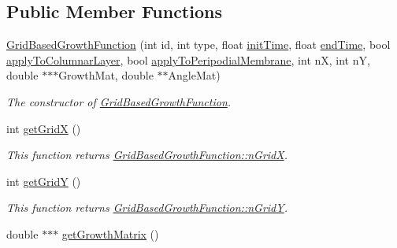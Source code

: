\subsection*{Public Member Functions}
\begin{DoxyCompactItemize}
\item 
\hyperlink{classGridBasedGrowthFunction_aac341fa9ccdca2d089e9f341cb68ca94}{Grid\+Based\+Growth\+Function} (int id, int type, float \hyperlink{classGrowthFunctionBase_ae92513a7b41637df8e26e7db35ddf97c}{init\+Time}, float \hyperlink{classGrowthFunctionBase_a3ff4db0573d354a75666a5f3ca446941}{end\+Time}, bool \hyperlink{classGrowthFunctionBase_a3d56771e7c145589a14e11cc331e0326}{apply\+To\+Columnar\+Layer}, bool \hyperlink{classGrowthFunctionBase_a08ae19f58cb98fa8e315a77f52749732}{apply\+To\+Peripodial\+Membrane}, int n\+X, int n\+Y, double $\ast$$\ast$$\ast$Growth\+Mat, double $\ast$$\ast$Angle\+Mat)
\begin{DoxyCompactList}\small\item\em The constructor of \hyperlink{classGridBasedGrowthFunction}{Grid\+Based\+Growth\+Function}. \end{DoxyCompactList}\item 
\hypertarget{classGridBasedGrowthFunction_ae36e6ea2e7bdf41459e74d5846d6d24d}{}int \hyperlink{classGridBasedGrowthFunction_ae36e6ea2e7bdf41459e74d5846d6d24d}{get\+Grid\+X} ()\label{classGridBasedGrowthFunction_ae36e6ea2e7bdf41459e74d5846d6d24d}

\begin{DoxyCompactList}\small\item\em This function returns \hyperlink{classGridBasedGrowthFunction_af872b9963f3a579dcd615c23bcb58a86}{Grid\+Based\+Growth\+Function\+::n\+Grid\+X}. \end{DoxyCompactList}\item 
\hypertarget{classGridBasedGrowthFunction_a4a70e9e187e3079e29115f106d30e26e}{}int \hyperlink{classGridBasedGrowthFunction_a4a70e9e187e3079e29115f106d30e26e}{get\+Grid\+Y} ()\label{classGridBasedGrowthFunction_a4a70e9e187e3079e29115f106d30e26e}

\begin{DoxyCompactList}\small\item\em This function returns \hyperlink{classGridBasedGrowthFunction_a625bc963a1f1e7d1f1a35dbd0ef51728}{Grid\+Based\+Growth\+Function\+::n\+Grid\+Y}. \end{DoxyCompactList}\item 
\hypertarget{classGridBasedGrowthFunction_ac25ac1f12b74816a1d3d3e5dda0e8541}{}double $\ast$$\ast$$\ast$ \hyperlink{classGridBasedGrowthFunction_ac25ac1f12b74816a1d3d3e5dda0e8541}{get\+Growth\+Matrix} ()\label{classGridBasedGrowthFunction_ac25ac1f12b74816a1d3d3e5dda0e8541}


\end{DoxyCompactItemize}
